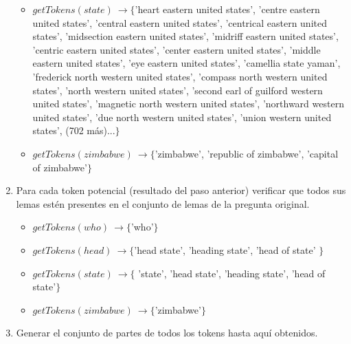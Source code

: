 \begin{enumerate}
\begin{itemize}
    \item $getTokens(state)\ \rightarrow  \{$'heart eastern united states', 'centre eastern united states', 'central eastern united states', 'centrical eastern united states', 'midsection eastern united states', 'midriff eastern united states', 'centric eastern united states', 'center eastern united states', 'middle eastern united states', 'eye eastern united states', 'camellia state yaman', 'frederick north western united states', 'compass north western united states', 'north western united states', 'second earl of guilford western united states', 'magnetic north western united states', 'northward western united states', 'due north western united states', 'union western united states', (702 más)...$\}$
    \item $getTokens(zimbabwe)\ \rightarrow \{$'zimbabwe', 'republic of zimbabwe', 'capital of zimbabwe'$\}$
  \end{itemize}
  \item Para cada token potencial (resultado del paso anterior) verificar que todos sus lemas estén presentes en el conjunto de lemas de la pregunta original.
  \begin{itemize}
    \item $getTokens(who)\ \rightarrow \{$'who'$\}$
    \item $getTokens(head)\ \rightarrow \{$'head state', 'heading state', 'head of state' $\}$
    \item $getTokens(state)\ \rightarrow  \{$  'state', 'head state', 'heading state', 'head of state'$\}$
    \item $getTokens(zimbabwe)\ \rightarrow \{$'zimbabwe'$\}$
  \end{itemize}
  \item Generar el conjunto de partes de todos los tokens hasta aquí obtenidos.
  \newline

\end{enumerate}
